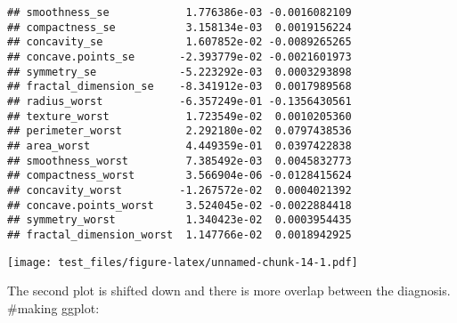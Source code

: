 \documentclass[
]{article}
\newenvironment{Shaded}{\begin{snugshade}}{\end{snugshade}}
\newcommand{\AttributeTok}[1]{\textcolor[rgb]{0.77,0.63,0.00}{#1}}
\newcommand{\CommentTok}[1]{\textcolor[rgb]{0.56,0.35,0.01}{\textit{#1}}}
\newcommand{\DecValTok}[1]{\textcolor[rgb]{0.00,0.00,0.81}{#1}}
\newcommand{\FunctionTok}[1]{\textcolor[rgb]{0.00,0.00,0.00}{#1}}
\newcommand{\NormalTok}[1]{#1}
\newcommand{\OtherTok}[1]{\textcolor[rgb]{0.56,0.35,0.01}{#1}}
\newcommand{\SpecialCharTok}[1]{\textcolor[rgb]{0.00,0.00,0.00}{#1}}
\newcommand{\StringTok}[1]{\textcolor[rgb]{0.31,0.60,0.02}{#1}}
\begin{document}
\begin{verbatim}
## smoothness_se            1.776386e-03 -0.0016082109
## compactness_se           3.158134e-03  0.0019156224
## concavity_se             1.607852e-02 -0.0089265265
## concave.points_se       -2.393779e-02 -0.0021601973
## symmetry_se             -5.223292e-03  0.0003293898
## fractal_dimension_se    -8.341912e-03  0.0017989568
## radius_worst            -6.357249e-01 -0.1356430561
## texture_worst            1.723549e-02  0.0010205360
## perimeter_worst          2.292180e-02  0.0797438536
## area_worst               4.449359e-01  0.0397422838
## smoothness_worst         7.385492e-03  0.0045832773
## compactness_worst        3.566904e-06 -0.0128415624
## concavity_worst         -1.267572e-02  0.0004021392
## concave.points_worst     3.524045e-02 -0.0022884418
## symmetry_worst           1.340423e-02  0.0003954435
## fractal_dimension_worst  1.147766e-02  0.0018942925
\end{verbatim}

\begin{Shaded}
\end{Shaded}

\texttt{[image: test\_files/figure-latex/unnamed-chunk-14-1.pdf]}

The second plot is shifted down and there is more overlap between the
diagnosis. \#making ggplot:

\begin{Shaded}
\end{Shaded}
\end{document}
